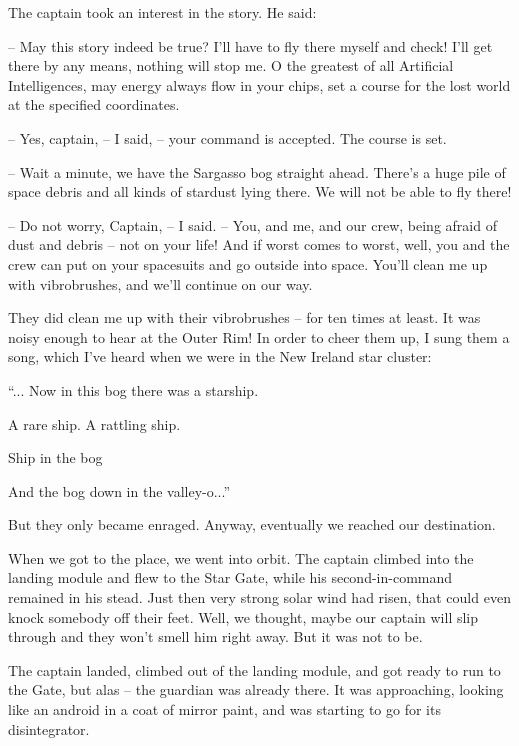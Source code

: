 \documentclass[ebook,oneside,final,openright]{memoir}
\begin{document}
\par
The captain took an interest in the story. He said:\par
– May this story indeed be true? I’ll have to fly there myself and check! I’ll get there by any means, nothing will stop me. O the greatest of all Artificial Intelligences, may energy always flow in your chips, set a course for the lost world at the specified coordinates.\par
– Yes, captain, – I said, – your command is accepted. The course is set.\par
– Wait a minute, we have the Sargasso bog straight ahead. There’s a huge pile of space debris and all kinds of stardust lying there. We will not be able to fly there!\par
– Do not worry, Captain, – I said. – You, and me, and our crew, being afraid of dust and debris – not on your life! And if worst comes to worst, well, you and the crew can put on your spacesuits and go outside into space. You’ll clean me up with vibrobrushes, and we’ll continue on our way.\par
\par
They did clean me up with their vibrobrushes – for ten times at least. It was noisy enough to hear at the Outer Rim! In order to cheer them up, I sung them a song, which I’ve heard when we were in the New Ireland star cluster: \par
“... Now in this bog there was a starship.\par
A rare ship. A rattling ship.\par
Ship in the bog\par
And the bog down in the valley-o...”\par
 But they only became enraged. Anyway, eventually we reached our destination.\par
\par
When we got to the place, we went into orbit. The captain climbed into the landing module and flew to the Star Gate, while his second-in-command remained in his stead. Just then very strong solar wind had risen, that could even knock somebody off their feet. Well, we thought, maybe our captain will slip through and they won’t smell him right away. But it was not to be.\par
\par
The captain landed, climbed out of the landing module, and got ready to run to the Gate, but alas – the guardian was already there. It was approaching, looking like an android in a coat of mirror paint, and was starting to go for its disintegrator.\par
\end{document}
